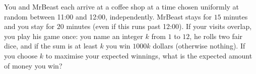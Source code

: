 You and MrBeast each arrive at a coffee shop at a time chosen uniformly at random between 11:00 and 12:00, independently. MrBeast stays for $15$ minutes and you stay for $20$ minutes (even if this runs past 12:00). If your visits overlap, you play his game once: you name an integer $k$ from $1$ to $12$, he rolls two fair dice, and if the sum is at least $k$ you win $1000k$ dollars (otherwise nothing). If you choose $k$ to maximise your expected winnings, what is the expected amount of money you win?
